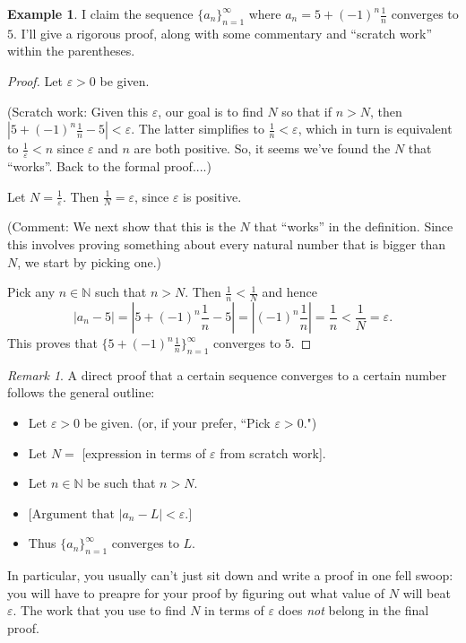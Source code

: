 \documentclass[12pt]{amsart}
\def\e{\varepsilon}
\newcommand{\N}{\mathbb{N}}
\numberwithin{equation}{section}
\theoremstyle{plain} %
\theoremstyle{definition}
\newtheorem{ex}[equation]{Example}
\theoremstyle{remark}
\newtheorem{rem}[equation]{Remark}
\begin{document}
\begin{ex} I claim the sequence $\{a_n\}_{n=1}^\infty$ where $a_n =  5 + (-1)^n \frac{1}{n}$ converges to $5$. I'll give a rigorous proof, along with some commentary and
  ``scratch work'' within the parentheses. 

\begin{proof} Let $\e > 0$ be given. 

(Scratch work: Given this $\e$, our goal is to find $N$ so that if $n > N$, then 
${|5 + (-1)^n \frac{1}{n} - 5|< \e}$. The latter simplifies to
$\frac{1}{n} < \e$, which in turn is equivalent to $\frac{1}{\e} < n$ since
$\e$ and $n$ are both positive.  So, it seems we've found the $N$ that
``works''. Back to the formal proof....)


Let $N = \frac{1}{\e}$. Then $\frac{1}{N}
= \e$, since $\e$ is positive.  

(Comment: We next show that this is the $N$ that ``works'' in
the definition. Since this involves proving something about every natural number that is bigger than $N$, 
we start by picking one.) 

Pick any $n \in \N$ such that  $n >
N$. Then $\frac{1}{n} < \frac{1}{N}$ and hence
$$
|a_n - 5| = |5 + (-1)^n \frac{1}{n} - 5| = 
|(-1)^n \frac{1}{n}| = \frac{1}{n} < \frac{1}{N} = \e.
$$
This proves that 
$\{5 + (-1)^n \frac{1}{n}\}_{n=1}^\infty$ converges to $5$.
\end{proof}
\end{ex}


\begin{rem} A direct proof that a certain sequence converges to a certain number follows the general outline:
\begin{itemize}
	\item Let $\e > 0$ be given. (or, if your prefer, ``Pick $\e > 0$.")
	\item Let $N =$ [expression in terms of $\e$ from scratch work].
	\item Let $n \in \N$ be such that $n > N$.
\item $\text{[Argument that $|a_n-L|<\e$.]}$
	\item Thus $\{a_n\}_{n=1}^{\infty}$ converges to $L$.
\end{itemize}

In particular, you usually can't just sit down and write a proof in one fell swoop: you will have to preapre for your proof by figuring out what value of $N$ will beat $\e$. The work that you use to find $N$ in terms of $\e$ does \emph{not} belong in the final proof.
\end{rem}
\end{document}
